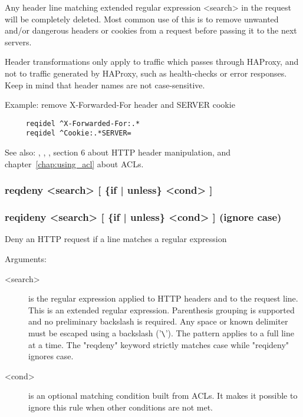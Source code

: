   Any header line matching extended regular expression <search> in the request
  will be completely deleted. Most common use of this is to remove unwanted
  and/or dangerous headers or cookies from a request before passing it to the
  next servers.

  Header transformations only apply to traffic which passes through HAProxy,
  and not to traffic generated by HAProxy, such as health-checks or error
  responses. Keep in mind that header names are not case-sensitive.

  Example: remove X-Forwarded-For header and SERVER cookie
\begin{verbatim}
     reqidel ^X-Forwarded-For:.*
     reqidel ^Cookie:.*SERVER=
\end{verbatim}


See also: , , , section 6 about HTTP header
            manipulation, and chapter~\ref{chap:using_acl} about ACLs.

\subsubsection[reqdeny]{reqdeny  <search> [ \{if | unless\} <cond> ]}
\subsubsection[reqideny]{reqideny <search> [ \{if | unless\} <cond> ]  (ignore case)}


  Deny an HTTP request if a line matches a regular expression


  Arguments:
\begin{description}
\item[<search>]  is the regular expression applied to HTTP headers and to the
              request line. This is an extended regular expression. Parenthesis
              grouping is supported and no preliminary backslash is required.
              Any space or known delimiter must be escaped using a backslash
              ('\verb|\|'). The pattern applies to a full line at a time. The
              "reqdeny" keyword strictly matches case while "reqideny" ignores
              case.

\item[<cond>] is an optional matching condition built from ACLs. It makes it
              possible to ignore this rule when other conditions are not met.
\end{description}

